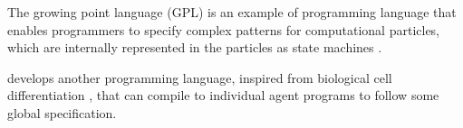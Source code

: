 The growing point language (GPL) is an example of programming language that
enables programmers to specify complex patterns for computational particles,
which are internally represented in the particles as state machines
\parencite{cooreBotanicalComputingDevelopmental1999}.

\textcite{nagpalProgrammableSelfassemblyUsing2002} develops another programming
language, inspired from biological cell differentiation
\parencite{lawrenceMakingFlyGenetics1992,
  wolpertPositionalInformationSpatial1969}, that can compile to individual agent
programs to follow some global specification.
